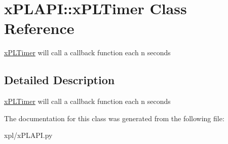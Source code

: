 \hypertarget{classxPLAPI_1_1xPLTimer}{
\section{xPLAPI::xPLTimer Class Reference}
\label{classxPLAPI_1_1xPLTimer}
}
\hyperlink{classxPLAPI_1_1xPLTimer}{xPLTimer} will call a callback function each n seconds  




\subsection{Detailed Description}
\hyperlink{classxPLAPI_1_1xPLTimer}{xPLTimer} will call a callback function each n seconds 

The documentation for this class was generated from the following file:\begin{CompactItemize}
\item 
xpl/xPLAPI.py\end{CompactItemize}

